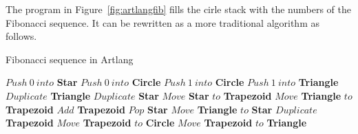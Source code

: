 The program in Figure~\ref{fig:artlangfib} fills the cirle stack with the numbers of the Fibonacci sequence.
It can be rewritten as a more traditional algorithm as follows.

\begin{algorithm}
    \caption{Fibonacci sequence in Artlang}
    \begin{algorithmic}
    \State $Push~0~into$ \textbf{Star}
    \State $Push~0~into$ \textbf{Circle}
    \State $Push~1~into$ \textbf{Circle}
    \State $Push~1~into$ \textbf{Triangle}
        \State $Duplicate$ \textbf{Triangle}
        \State $Duplicate$ \textbf{Star}
        \State $Move$ \textbf{Star} $to$ \textbf{Trapezoid}
        \State $Move$ \textbf{Triangle} $to$ \textbf{Trapezoid}
        \State $Add$ \textbf{Trapezoid}
        \State $Pop$ \textbf{Star}
        \State $Move$ \textbf{Triangle} $to$ \textbf{Star}
        \State $Duplicate$ \textbf{Trapezoid}
        \State $Move$ \textbf{Trapezoid} $to$ \textbf{Circle}
        \State $Move$ \textbf{Trapezoid} $to$ \textbf{Triangle}
    \EndWhile
    \end{algorithmic}
\end{algorithm}